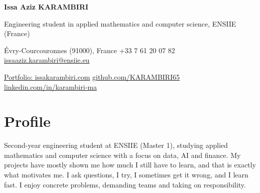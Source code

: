 \documentclass[10pt]{article}
\newif\ifstage
\begin{document}
{\fontsize{24}{26}\selectfont\bfseries Issa Aziz KARAMBIRI}\par\vspace{3pt}
Engineering student in applied mathematics and computer science, ENSIIE (France)\par
\ifstage\textbf{Looking for a 3 to 4 month internship from May 2027 in data science, AI, data analysis or finance}\par\fi\vspace{2pt}
Évry-Courcouronnes (91000), France \quad\textperiodcentered\quad +33 7 61 20 07 82 \quad\textperiodcentered\quad \href{mailto:issaaziz.karambiri@ensiie.eu}{issaaziz.karambiri@ensiie.eu}\par
\href{https://issakarambiri.com}{Portfolio: issakarambiri.com} \quad\textperiodcentered\quad \href{https://github.com/KARAMBIRI65}{github.com/KARAMBIRI65} \quad\textperiodcentered\quad \href{https://www.linkedin.com/in/karambiri-ma}{linkedin.com/in/karambiri-ma}\par

\section*{Profile}
\ifstage
Second-year engineering student at ENSIIE (Master 1), I am looking for an internship where I am given real work, even if it takes me out of my comfort zone. My projects have mostly shown me how much I still have to learn, and that is exactly what motivates me. I ask questions, I try, I sometimes get it wrong, and I learn fast. I want to join a demanding team, learn from it and take on more responsibility as the internship goes on.
\else
Second-year engineering student at ENSIIE (Master 1), studying applied mathematics and computer science with a focus on data, AI and finance. My projects have mostly shown me how much I still have to learn, and that is exactly what motivates me. I ask questions, I try, I sometimes get it wrong, and I learn fast. I enjoy concrete problems, demanding teams and taking on responsibility.
\fi
\end{document}
